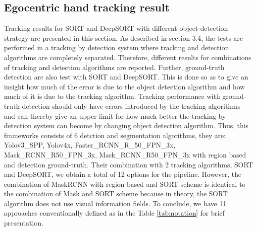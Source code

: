 \subsection{Egocentric hand tracking result}
Tracking results for SORT and DeepSORT with different object detection strategy are presented in this section. As described in section 3.4, the tests are performed in a tracking by detection system where tracking and detection algorithms are completely separated. Therefore, different results for combinations of tracking and detection algorithms are reported. Further, ground-truth detection are also test with SORT and DeepSORT. This is done so as to give an insight how much of the error is due to the object detection algorithm and how much of it is due to the tracking algorithm. Tracking performance with ground-truth detection should only have errors introduced by the tracking algorithms and can thereby give an upper limit for how much better the tracking by detection system can become by changing object detection algorithm. Thus, this frameworks consists of 6 detction and segmentation algorithms, they are: Yolov3\_SPP, Yolov4x, Faster\_RCNN\_R\_50\_FPN\_3x, Mask\_RCNN\_R50\_FPN\_3x, Mask\_RCNN\_R50\_FPN\_3x with region based and detection ground-truth. Their combination with 2 tracking algorithms, SORT and DeepSORT, we obtain a total of 12 options for the pipeline. However, the combination of MaskRCNN with region based and SORT scheme is identical to the combination of Mask and SORT scheme because in theory, the SORT algorithm does not use visual information fields. To conclude, we have 11 approaches conventionally defined as in the Table \ref{tab:notation} for brief presentation.
